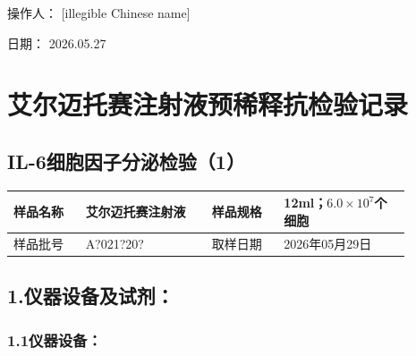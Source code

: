 \documentclass[UTF8,10pt,a4paper,fontset=fandol]{ctexart}
\newcommand{\fieldvalue}[1]{#1}
\newcommand{\handwritten}[1]{#1}
\begin{document}
\vfill

\noindent 操作人：
\fieldvalue{\handwritten{[illegible Chinese name]}}

\hfill
日期：
\fieldvalue{\handwritten{2026.05.27}}

\newpage

\section*{艾尔迈托赛注射液预稀释抗检验记录}

\subsection*{IL-6细胞因子分泌检验（1）}

\begin{tabular}{|p{0.16\linewidth}|p{0.28\linewidth}|p{0.16\linewidth}|p{0.28\linewidth}|}
\hline
样品名称 &
\fieldvalue{艾尔迈托赛注射液} &
样品规格 & 12ml；$6.0\times10^{7}$个细胞 \\
\hline
样品批号 &
\fieldvalue{\handwritten{A?021?20?}} &
取样日期 &
\fieldvalue{\handwritten{2026年05月29日}} \\
\hline
\end{tabular}

\subsection*{1.\quad 仪器设备及试剂：}

\subsubsection*{1.1\quad 仪器设备：}
\end{document}
